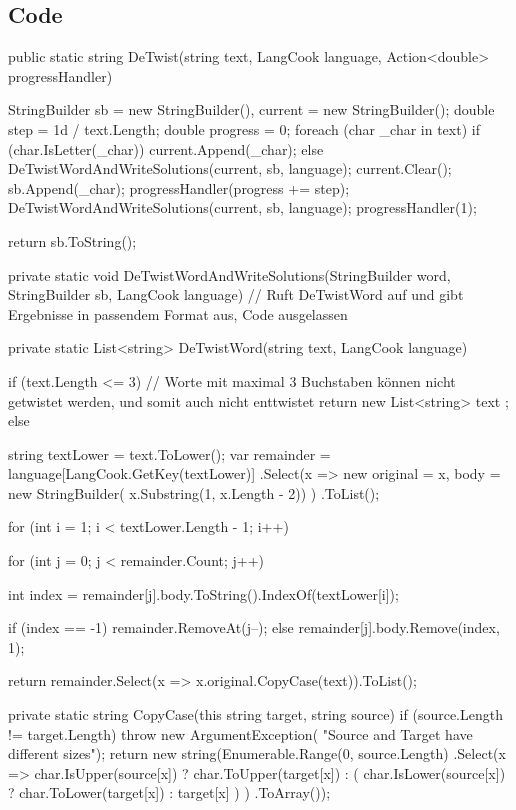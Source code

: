 \documentclass{article}
\begin{document}
\begin{flushleft}
\newpage
\subsection{Code}
\begin{Csharp}
public static string DeTwist(string text, LangCook language, 
	Action<double> progressHandler)
{
    StringBuilder sb = new StringBuilder(), current = new StringBuilder();
    double step = 1d / text.Length;
    double progress = 0;
    foreach (char _char in text)
    {
        if (char.IsLetter(_char)) current.Append(_char);
        else
        {
            DeTwistWordAndWriteSolutions(current, sb, language);
            current.Clear();
            sb.Append(_char);
        }
        progressHandler(progress += step);
    }
    DeTwistWordAndWriteSolutions(current, sb, language);
    progressHandler(1);

    return sb.ToString();
}

private static void DeTwistWordAndWriteSolutions(StringBuilder word, 
	StringBuilder sb, LangCook language)
// Ruft DeTwistWord auf und gibt Ergebnisse in passendem Format aus, Code ausgelassen

private static List<string> DeTwistWord(string text, LangCook language)
{
    if (text.Length <= 3) 
    	// Worte mit maximal 3 Buchstaben können nicht getwistet werden, und somit auch nicht enttwistet
    {
        return new List<string> { text };
    }
    else
    {
        string textLower = text.ToLower();
        var remainder = language[LangCook.GetKey(textLower)]
                        .Select(x => new
                        {
                            original = x,
                            body = new StringBuilder(
                            	x.Substring(1, x.Length - 2))
                        })
                        .ToList();

        for (int i = 1; i < textLower.Length - 1; i++)
        {
            for (int j = 0; j < remainder.Count; j++)
            {
                int index = remainder[j].body.ToString().IndexOf(textLower[i]);

                if (index == -1) remainder.RemoveAt(j--);
                else remainder[j].body.Remove(index, 1);
            }
        }


        return remainder.Select(x => x.original.CopyCase(text)).ToList();
    }
}

private static string CopyCase(this string target, string source)
{
    if (source.Length != target.Length) throw new ArgumentException(
    	"Source and Target have different sizes");
    return new string(Enumerable.Range(0, source.Length)
        .Select(x => 
        	char.IsUpper(source[x]) ? 
        	    char.ToUpper(target[x])
        	  : (
        	  		char.IsLower(source[x]) ?
        	   		    char.ToLower(target[x]) 
        	    	  : target[x]
        	    )
        )
        .ToArray());
}
\end{Csharp}


\end{flushleft}
\end{document}

